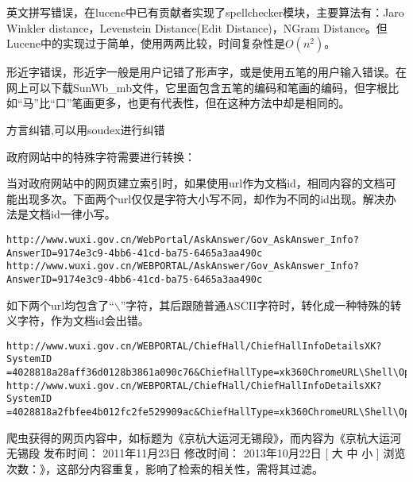 \par 英文拼写错误，在lucene中已有贡献者实现了spellchecker模块，主要算法有：Jaro Winkler distance，Levenstein Distance(Edit Distance)，NGram Distance。但Lucene中的实现过于简单，使用两两比较，时间复杂性是$O(n^2)$。
\par 形近字错误，形近字一般是用户记错了形声字，或是使用五笔的用户输入错误。在网上可以下载SunWb\_mb文件，它里面包含五笔的编码和笔画的编码，但字根比如“马”比“口”笔画更多，也更有代表性，但在这种方法中却是相同的。
\par 方言纠错,可以用soudex进行纠错
\par 政府网站中的特殊字符需要进行转换：
\par 当对政府网站中的网页建立索引时，如果使用url作为文档id，相同内容的文档可能出现多次。下面两个url仅仅是字符大小写不同，却作为不同的id出现。解决办法是文档id一律小写。
\begin{verbatim}
http://www.wuxi.gov.cn/WebPortal/AskAnswer/Gov_AskAnswer_Info?
AnswerID=9174e3c9-4bb6-41cd-ba75-6465a3aa490c
http://www.wuxi.gov.cn/WEBPORTAL/AskAnswer/Gov_AskAnswer_Info?
AnswerID=9174e3c9-4bb6-41cd-ba75-6465a3aa490c
\end{verbatim}
\par 如下两个url均包含了“$\backslash$”字符，其后跟随普通ASCII字符时，转化成一种特殊的转义字符，作为文档id会出错。
\begin{verbatim}
http://www.wuxi.gov.cn/WEBPORTAL/ChiefHall/ChiefHallInfoDetailsXK?SystemID
=4028818a28aff36d0128b3861a090c76&ChiefHallType=xk360ChromeURL\Shell\Open\Command
http://www.wuxi.gov.cn/WEBPORTAL/ChiefHall/ChiefHallInfoDetailsXK?SystemID
=4028818a2fbfee4b012fc2fe529909ac&ChiefHallType=xk360ChromeURL\Shell\Open\Command
\end{verbatim}
\par 爬虫获得的网页内容中，如标题为《京杭大运河无锡段》，而内容为《京杭大运河无锡段 发布时间： 2011年11月23日 修改时间： 2013年10月22日 [ 大 中 小 ] 浏览次数：》，这部分内容重复，影响了检索的相关性，需将其过滤。


